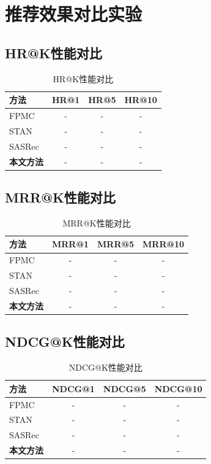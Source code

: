 \section{推荐效果对比实验}
\label{sec:recommendation_comparison}

\subsection{HR@K性能对比}
\label{sec:hrk_comparison}

\begin{table}[htbp]
\centering
\caption{HR@K性能对比}
\label{tab:hrk_comparison}
\begin{tabular}{lccc}
\toprule
方法 & HR@1 & HR@5 & HR@10 \\
\midrule
FPMC & - & - & - \\
STAN & - & - & - \\
SASRec & - & - & - \\
\textbf{本文方法} & - & - & - \\
\bottomrule
\end{tabular}
\end{table}

\subsection{MRR@K性能对比}
\label{sec:mrrk_comparison}

\begin{table}[htbp]
\centering
\caption{MRR@K性能对比}
\label{tab:mrrk_comparison}
\begin{tabular}{lccc}
\toprule
方法 & MRR@1 & MRR@5 & MRR@10 \\
\midrule
FPMC & - & - & - \\
STAN & - & - & - \\
SASRec & - & - & - \\
\textbf{本文方法} & - & - & - \\
\bottomrule
\end{tabular}
\end{table}

\subsection{NDCG@K性能对比}
\label{sec:ndcgk_comparison}

\begin{table}[htbp]
\centering
\caption{NDCG@K性能对比}
\label{tab:ndcgk_comparison}
\begin{tabular}{lccc}
\toprule
方法 & NDCG@1 & NDCG@5 & NDCG@10 \\
\midrule
FPMC & - & - & - \\
STAN & - & - & - \\
SASRec & - & - & - \\
\textbf{本文方法} & - & - & - \\
\bottomrule
\end{tabular}
\end{table}

